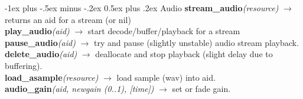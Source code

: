 \documentclass[10pt,landscape]{article}
\makeatletter
\renewcommand{\section}{\@startsection{section}{1}{0mm}%
                                {-1ex plus -.5ex minus -.2ex}%
                                {0.5ex plus .2ex}%
                                {\normalfont\large\bfseries}}
\makeatother
\begin{document}
\begin{multicols}{3}
\section{Audio}
	\textbf{stream\_audio}\emph{(resource)} $\rightarrow$ returns an aid for a stream (or nil)\\
	\textbf{play\_audio}\emph{(aid)} $\rightarrow$ start decode/buffer/playback for a stream\\
	\textbf{pause\_audio}\emph{(aid)} $\rightarrow$ try and pause (slightly unstable) audio stream playback.\\
	\textbf{delete\_audio}\emph{(aid)} $\rightarrow$ deallocate and stop playback (slight delay due to buffering).\\
	\textbf{load\_asample}\emph{(resource)} $\rightarrow$ load sample (wav) into aid.\\
	\textbf{audio\_gain}\emph{(aid, newgain (0..1), [time])} $\rightarrow$ set or fade gain.\\


\end{multicols}
\end{document}
